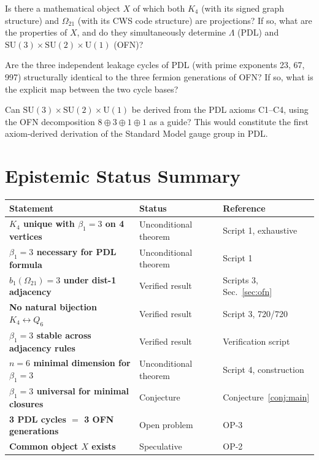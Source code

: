 \documentclass[11pt,a4paper]{article}
\begin{document}
\begin{open_box}[title={OP-2: Identification of the common object $X$}]
Is there a mathematical object $X$ of which both $K_4$ (with its signed graph structure) and $\Omega_{21}$ (with its CWS code structure) are projections? If so, what are the properties of $X$, and do they simultaneously determine $\Lambda$ (PDL) and $\mathrm{SU}(3) \times \mathrm{SU}(2) \times \mathrm{U}(1)$ (OFN)?
\end{open_box}

\begin{open_box}[title={OP-3: Three leakage cycles and three fermion generations}]
Are the three independent leakage cycles of PDL (with prime exponents 23, 67, 997) structurally identical to the three fermion generations of OFN? If so, what is the explicit map between the two cycle bases?
\end{open_box}

\begin{open_box}[title={OP-4: Derivation of the Standard Model gauge group from C1--C4}]
Can $\mathrm{SU}(3) \times \mathrm{SU}(2) \times \mathrm{U}(1)$ be derived from the PDL axioms C1--C4, using the OFN decomposition $8 \oplus 3 \oplus 1 \oplus 1$ as a guide? This would constitute the first axiom-derived derivation of the Standard Model gauge group in PDL.
\end{open_box}

\section{Epistemic Status Summary}
\label{sec:epistemic}

\begin{center}
\begin{tabular}{>{\bfseries}p{5cm} p{4cm} p{4.5cm}}
\toprule
Statement & Status & Reference \\
\midrule
$K_4$ unique with $\beta_1=3$ on 4 vertices & Unconditional theorem & Script 1, exhaustive \\
$\beta_1 = 3$ necessary for PDL formula & Unconditional theorem & Script 1 \\
$b_1(\Omega_{21}) = 3$ under dist-1 adjacency & Verified result & Scripts 3, Sec.~\ref{sec:ofn} \\
No natural bijection $K_4 \leftrightarrow Q_6$ & Verified result & Script 3, 720/720 \\
$\beta_1=3$ stable across adjacency rules & Verified result & Verification script \\
$n=6$ minimal dimension for $\beta_1=3$ & Unconditional theorem & Script 4, construction \\
$\beta_1=3$ universal for minimal closures & Conjecture & Conjecture~\ref{conj:main} \\
3 PDL cycles $=$ 3 OFN generations & Open problem & OP-3 \\
Common object $X$ exists & Speculative & OP-2 \\
\bottomrule
\end{tabular}
\end{center}
\end{document}
